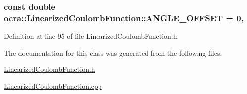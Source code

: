 \subsubsection[{\texorpdfstring{A\+N\+G\+L\+E\+\_\+\+O\+F\+F\+S\+ET}{ANGLE_OFFSET}}]{\setlength{\rightskip}{0pt plus 5cm}const double ocra\+::\+Linearized\+Coulomb\+Function\+::\+A\+N\+G\+L\+E\+\_\+\+O\+F\+F\+S\+ET = 0\hspace{0.3cm}{\ttfamily [static]}, {\ttfamily [protected]}}\hypertarget{classocra_1_1LinearizedCoulombFunction_a1778e1ecca6c7d54f846a750f9a06552}{}\label{classocra_1_1LinearizedCoulombFunction_a1778e1ecca6c7d54f846a750f9a06552}


Definition at line 95 of file Linearized\+Coulomb\+Function.\+h.



The documentation for this class was generated from the following files\+:\begin{DoxyCompactItemize}
\item 
\hyperlink{LinearizedCoulombFunction_8h}{Linearized\+Coulomb\+Function.\+h}\item 
\hyperlink{LinearizedCoulombFunction_8cpp}{Linearized\+Coulomb\+Function.\+cpp}\end{DoxyCompactItemize}
